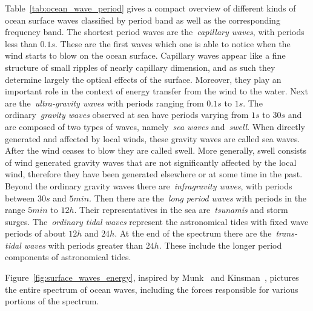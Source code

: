 Table~\ref{tab:ocean_wave_period} gives a compact overview of different kinds 
of ocean surface waves classified by period band as well as the corresponding 
frequency band. The shortest period waves are the~\emph{capillary waves}, with 
periods less than $0.1s$. These are the first waves which one is able to notice 
when the wind starts to blow on the ocean surface. Capillary waves appear like 
a fine structure of small ripples of nearly capillary dimension, and as such 
they determine largely the optical effects of the surface. Moreover, they play 
an important role in the context of energy transfer from the wind to the water.
Next are the~\emph{ultra-gravity waves} with periods ranging from $0.1s$ to 
$1s$. The ordinary~\emph{gravity waves} observed at sea have periods varying 
from $1s$ to $30s$ and are composed of two types of waves, namely~\emph{sea 
waves} and~\emph{swell}. When directly generated and affected by local winds, 
these gravity waves are called sea waves. After the wind ceases to blow they 
are called swell. More generally, swell consists of wind generated gravity 
waves that are not significantly affected by the local wind, therefore they have 
been generated elsewhere or at some time in the past. Beyond the ordinary 
gravity waves there are~\emph{infragravity waves}, with periods between $30s$ 
and $5min$. Then there are the~\emph{long period waves} with periods in the 
range $5min$ to $12h$. Their representatives in the sea are~\emph{tsunamis} 
and storm surges. The~\emph{ordinary tidal waves} represent the astronomical 
tides with fixed wave periods of about $12h$ and $24h$. At the end of the 
spectrum there are the~\emph{trans-tidal waves} with periods greater than 
$24h$. These include the longer period components of astronomical tides.

Figure~\ref{fig:surface_waves_energy}, inspired by Munk~\cite{article:munkorigin} and Kinsman~\cite{book:kinsman2002wind}, pictures the entire
spectrum of ocean waves, including the forces responsible for various portions of the
spectrum.\\

